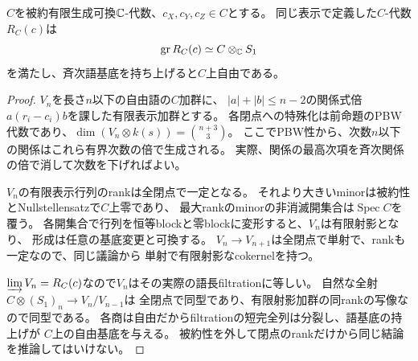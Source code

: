 \begin{proposition}[被約有限型基底上の相対PBW性]
\label{prop:quotient-relative-pbw}
$C$を被約有限生成可換$\mathbb C$-代数、$c_X,c_Y,c_Z\in C$とする。
同じ表示で定義した$C$-代数$R_C(c)$は
\[
 \operatorname{gr}R_C(c)\simeq C\otimes_\mathbb C S_1
\]
を満たし、斉次語基底を持ち上げると$C$上自由である。
\end{proposition}
\begin{proof}
$V_n$を長さ$n$以下の自由語の$C$加群に、
$|a|+|b|\le n-2$の関係式倍$a(r_i-c_i)b$を課した有限表示加群とする。
各閉点への特殊化は前命題のPBW代数であり、$\dim(V_n\otimes k(s))=\binom{n+3}{3}$。
ここでPBW性から、次数$n$以下の関係はこれら有界次数の倍で生成される。
実際、関係の最高次項を斉次関係の倍で消して次数を下げればよい。

$V_n$の有限表示行列のrankは全閉点で一定となる。
それより大きいminorは被約性とNullstellensatzで$C$上零であり、
最大rankのminorの非消滅開集合は$\operatorname{Spec}C$を覆う。
各開集合で行列を恒等blockと零blockに変形すると、$V_n$は有限射影となり、
形成は任意の基底変更と可換する。
$V_n\to V_{n+1}$は全閉点で単射で、rankも一定なので、同じ議論から
単射で有限射影なcokernelを持つ。

$\varinjlim V_n=R_C(c)$なので$V_n$はその実際の語長filtrationに等しい。
自然な全射$C\otimes(S_1)_n\to V_n/V_{n-1}$は
全閉点で同型であり、有限射影加群の同rankの写像なので同型である。
各商は自由だからfiltrationの短完全列は分裂し、語基底の持上げが
$C$上の自由基底を与える。
被約性を外して閉点のrankだけから同じ結論を推論してはいけない。
\end{proof}

